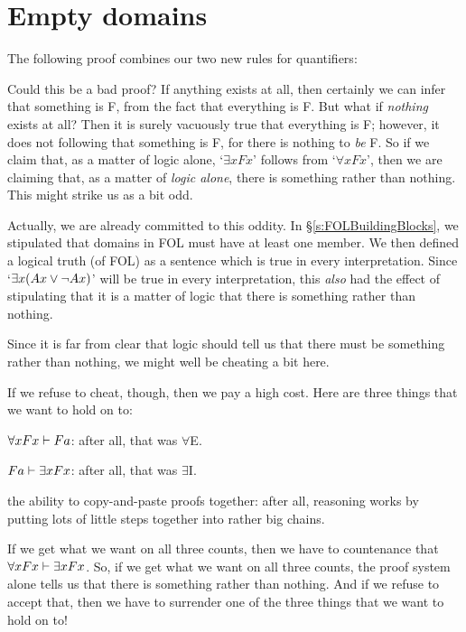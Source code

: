 \section{Empty domains}
The following proof combines our two new rules for quantifiers:
	\begin{pf}
	\end{pf}
Could this be a bad proof? If anything exists at all, then certainly we can infer that something is F, from the fact that everything is F. But what if \emph{nothing} exists at all? Then it is surely vacuously true that everything is F; however, it does not following that something is F, for there is nothing to \emph{be} F. So if we claim that, as a matter of logic alone, `$\exists x Fx$' follows from `$\forall x Fx$', then we are claiming that, as a matter of \emph{logic alone}, there is something rather than nothing. This might strike us as a bit odd.

Actually, we are already committed to this oddity. In \S\ref{s:FOLBuildingBlocks}, we stipulated that domains in FOL must have at least one member. We then defined a logical truth (of FOL) as a sentence which is true in every interpretation. Since `$\exists x(Ax\vee\neg Ax)$' will be true in every interpretation, this \emph{also} had the effect of stipulating that it is a matter of logic that there is something rather than nothing.

Since it is far from clear that logic should tell us that there must be something rather than nothing, we might well be cheating a bit here.

If we refuse to cheat, though, then we pay a high cost. Here are three things that we want to hold on to:
	\begin{ebullet}
		\item $\forall x Fx \vdash Fa$: after all, that was $\forall$E.
		\item $Fa \vdash \exists x Fx$: after all, that was $\exists$I.
		\item the ability to copy-and-paste proofs together: after all, reasoning works by putting lots of little steps together into rather big chains.
	\end{ebullet}
If we get what we want on all three counts, then we have to countenance that $\forall xFx \vdash \exists x Fx$. So, if we get what we want on all three counts, the proof system alone tells us that there is something rather than nothing. And if we refuse to accept that, then we have to surrender one of the three things that we want to hold on to!

